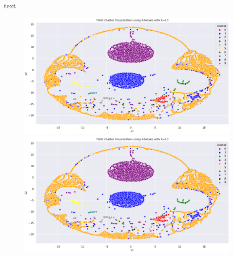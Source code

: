         text %
        
        \begin{figure}[h]
            \centering
            \begin{minipage}[c]{0.47\textwidth}
                \centering
                \includegraphics[width=\textwidth]{../figures/plots/section3/tsne_kmeans_clusters_1.png}
                \caption{}
                \label{fig:}
            \end{minipage}
            \hfill
            \begin{minipage}[c]{0.47\textwidth}
                \centering
                \includegraphics[width=\textwidth]{../figures/plots/section3/tsne_kmeans_clusters_1.png}
                \caption{}
                \label{fig:}
            \end{minipage}
        \end{figure}
    
    \clearpage
    